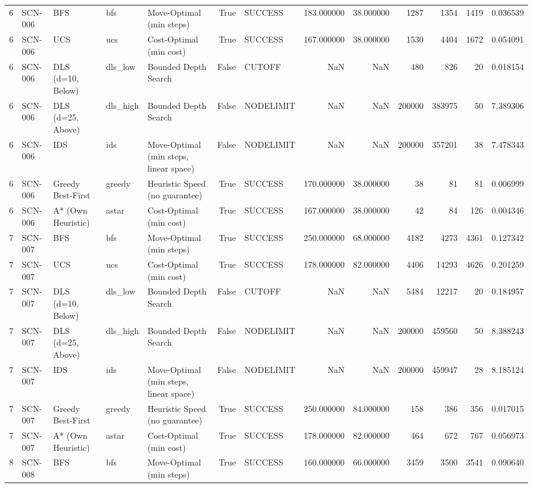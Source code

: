 \begin{table}[htbp]
\begin{tabular}{rllllrlrrrrrr}
6 & SCN-006 & BFS & bfs & Move-Optimal (min steps) & True & SUCCESS & 183.000000 & 38.000000 & 1287 & 1354 & 1419 & 0.036539 \\
6 & SCN-006 & UCS & ucs & Cost-Optimal (min cost) & True & SUCCESS & 167.000000 & 38.000000 & 1530 & 4404 & 1672 & 0.054091 \\
6 & SCN-006 & DLS (d=10, Below) & dls\_low & Bounded Depth Search & False & CUTOFF & NaN & NaN & 480 & 826 & 20 & 0.018154 \\
6 & SCN-006 & DLS (d=25, Above) & dls\_high & Bounded Depth Search & False & NODELIMIT & NaN & NaN & 200000 & 383975 & 50 & 7.389306 \\
6 & SCN-006 & IDS & ids & Move-Optimal (min steps, linear space) & False & NODELIMIT & NaN & NaN & 200000 & 357201 & 38 & 7.478343 \\
6 & SCN-006 & Greedy Best-First & greedy & Heuristic Speed (no guarantee) & True & SUCCESS & 170.000000 & 38.000000 & 38 & 81 & 81 & 0.006999 \\
6 & SCN-006 & A* (Own Heuristic) & astar & Cost-Optimal (min cost) & True & SUCCESS & 167.000000 & 38.000000 & 42 & 84 & 126 & 0.004346 \\
7 & SCN-007 & BFS & bfs & Move-Optimal (min steps) & True & SUCCESS & 250.000000 & 68.000000 & 4182 & 4273 & 4361 & 0.127342 \\
7 & SCN-007 & UCS & ucs & Cost-Optimal (min cost) & True & SUCCESS & 178.000000 & 82.000000 & 4406 & 14293 & 4626 & 0.201259 \\
7 & SCN-007 & DLS (d=10, Below) & dls\_low & Bounded Depth Search & False & CUTOFF & NaN & NaN & 5484 & 12217 & 20 & 0.184957 \\
7 & SCN-007 & DLS (d=25, Above) & dls\_high & Bounded Depth Search & False & NODELIMIT & NaN & NaN & 200000 & 459560 & 50 & 8.388243 \\
7 & SCN-007 & IDS & ids & Move-Optimal (min steps, linear space) & False & NODELIMIT & NaN & NaN & 200000 & 459947 & 28 & 8.185124 \\
7 & SCN-007 & Greedy Best-First & greedy & Heuristic Speed (no guarantee) & True & SUCCESS & 250.000000 & 84.000000 & 158 & 386 & 356 & 0.017015 \\
7 & SCN-007 & A* (Own Heuristic) & astar & Cost-Optimal (min cost) & True & SUCCESS & 178.000000 & 82.000000 & 464 & 672 & 767 & 0.056973 \\
8 & SCN-008 & BFS & bfs & Move-Optimal (min steps) & True & SUCCESS & 160.000000 & 66.000000 & 3459 & 3500 & 3541 & 0.090640 \\

\end{tabular}
\end{table}
